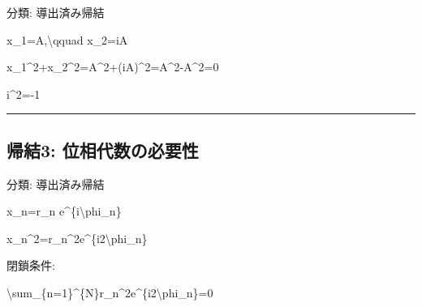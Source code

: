 \documentclass[
  a4paper,
]{ltjsarticle}
\newenvironment{Shaded}{}{}
\newcommand{\NormalTok}[1]{#1}
\begin{document}
分類: 導出済み帰結

\begin{Shaded}
\begin{Highlighting}[]
\NormalTok{x\_1=A,\textbackslash{}qquad x\_2=iA}
\end{Highlighting}
\end{Shaded}

\begin{Shaded}
\begin{Highlighting}[]
\NormalTok{x\_1\^{}2+x\_2\^{}2=A\^{}2+(iA)\^{}2=A\^{}2{-}A\^{}2=0}
\end{Highlighting}
\end{Shaded}

\begin{Shaded}
\begin{Highlighting}[]
\NormalTok{i\^{}2={-}1}
\end{Highlighting}
\end{Shaded}

\begin{center}\rule{0.5\linewidth}{0.5pt}\end{center}

\subsection{帰結3:
位相代数の必要性}\label{ux5e30ux7d503-ux4f4dux76f8ux4ee3ux6570ux306eux5fc5ux8981ux6027}

分類: 導出済み帰結

\begin{Shaded}
\begin{Highlighting}[]
\NormalTok{x\_n=r\_n e\^{}\{i\textbackslash{}phi\_n\}}
\end{Highlighting}
\end{Shaded}

\begin{Shaded}
\begin{Highlighting}[]
\NormalTok{x\_n\^{}2=r\_n\^{}2e\^{}\{i2\textbackslash{}phi\_n\}}
\end{Highlighting}
\end{Shaded}

閉鎖条件:

\begin{Shaded}
\begin{Highlighting}[]
\NormalTok{\textbackslash{}sum\_\{n=1\}\^{}\{N\}r\_n\^{}2e\^{}\{i2\textbackslash{}phi\_n\}=0}
\end{Highlighting}
\end{Shaded}
\end{document}

